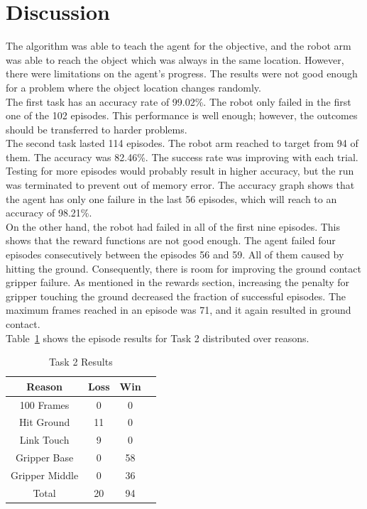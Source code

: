 \documentclass[10pt,journal,compsoc]{IEEEtran}
\begin{document}
\section{Discussion}
The algorithm was able to teach the agent for the objective, and the robot arm was able to reach the object which was always in the same location. However, there were limitations on the agent's progress. The results were not good enough for a problem where the object location changes randomly.\\
The first task has an accuracy rate of 99.02\%. The robot only failed in the first one of the 102 episodes. This performance is well enough; however, the outcomes should be transferred to harder problems.\\
The second task lasted 114 episodes. The robot arm reached to target from 94 of them. The accuracy was 82.46\%. The success rate was improving with each trial. Testing for more episodes would probably result in higher accuracy, but the run was terminated to prevent out of memory error.  The accuracy graph shows that the agent has only one failure in the last 56 episodes, which will reach to an accuracy of 98.21\%.\\
On the other hand, the robot had failed in all of the first nine episodes. This shows that the reward functions are not good enough. The agent failed four episodes consecutively between the episodes 56 and 59. All of them caused by hitting the ground. Consequently, there is room for improving the ground contact gripper failure. As mentioned in the rewards section, increasing the penalty for gripper touching the ground decreased the fraction of successful episodes. The maximum frames reached in an episode was 71, and it again resulted in ground contact.\\
Table~\ref{table:t2r} shows the episode results for Task 2 distributed over reasons.
\begin{table}[h]
\caption{Task 2 Results}
\label{table:t2r}
\begin{center}
\begin{tabular}{|c||c||c||c|}
\hline
Reason & Loss & Win\\
\hline
100 Frames & 0 & 0\\
\hline
Hit Ground & 11 & 0\\
\hline
Link Touch & 9 & 0\\
\hline
Gripper Base & 0 & 58\\
\hline
Gripper Middle & 0 & 36\\
\hline
Total & 20 & 94\\
\hline

\end{tabular}
\end{center}
\end{table}
\end{document}
